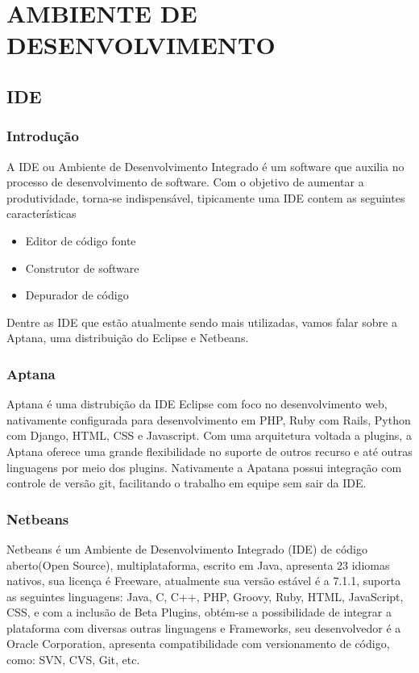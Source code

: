 \documentclass[12pt,a4paper]{article}
\begin{document}
\clearpage
\section{AMBIENTE DE DESENVOLVIMENTO}

	\subsection{IDE}
	
		\subsubsection{Introdução}

				A IDE ou Ambiente de Desenvolvimento Integrado é um software que auxilia no
				processo de desenvolvimento de software. Com o objetivo de aumentar a
				produtividade, torna-se indispensável, tipicamente uma IDE contem as
				seguintes características
				\begin{itemize}
					\item Editor de código fonte
					\item Construtor de software
					\item Depurador de código
				\end{itemize}
				
				Dentre as IDE que estão atualmente sendo mais utilizadas, vamos falar sobre
				a Aptana, uma distribuição do Eclipse e Netbeans.
		
		\subsubsection{Aptana}
		
			Aptana é uma distrubição da IDE Eclipse com foco no desenvolvimento web, nativamente configurada para
			desenvolvimento em PHP, Ruby com Rails, Python com Django, HTML, CSS e Javascript. Com uma arquitetura voltada a
			plugins, a Aptana oferece uma grande flexibilidade no suporte de outros recurso e até outras linguagens por meio dos
			plugins. Nativamente a Apatana possui integração com controle de versão git, facilitando o trabalho em equipe sem
			sair da IDE.
		
		\subsubsection{Netbeans}
		
			Netbeans é um Ambiente de Desenvolvimento Integrado (IDE) de código aberto(Open Source), multiplataforma, escrito em
			Java, apresenta 23 idiomas nativos, sua licença é Freeware, atualmente sua versão estável é a 7.1.1, suporta as
			seguintes linguagens: Java, C, C++, PHP, Groovy, Ruby, HTML, JavaScript, CSS, e com a inclusão de Beta Plugins,
			obtém-se a possibilidade de integrar a plataforma com diversas outras linguagens e Frameworks, seu desenvolvedor é a
			Oracle Corporation, apresenta compatibilidade com versionamento de código, como: SVN, CVS, Git, etc.
		
\end{document}
